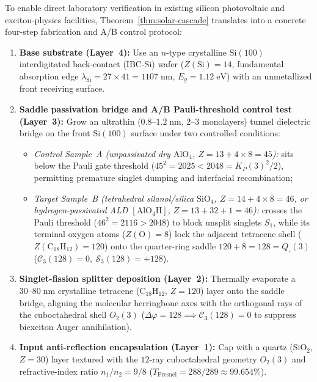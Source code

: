 \documentclass[11pt,a4paper]{article}
\theoremstyle{plain}
\theoremstyle{definition}
\begin{document}
To enable direct laboratory verification in existing silicon photovoltaic and exciton-physics facilities, Theorem~\ref{thm:solar-cascade} translates into a concrete four-step fabrication and A/B control protocol:
\begin{enumerate}[label=\textbf{Step~\arabic*.},leftmargin=*]
\item \textbf{Base substrate (Layer~4):}
  Use an $n$-type crystalline $\mathrm{Si}(100)$ interdigitated back-contact (IBC-$\mathrm{Si}$) wafer ($Z(\mathrm{Si})=14$, fundamental absorption edge $\lambda_{\mathrm{Si}} = 27\times 41 = 1107\;\text{nm}$, $E_g = 1.12\;\text{eV}$) with an unmetallized front receiving surface.
\item \textbf{Saddle passivation bridge and A/B Pauli-threshold control test (Layer~3):}
  Grow an ultrathin ($0.8\text{--}1.2\;\text{nm}$, $2\text{--}3$ monolayers) tunnel dielectric bridge on the front $\mathrm{Si}(100)$ surface under two controlled conditions:
  \begin{itemize}[noitemsep]
  \item \emph{Control Sample~A (unpassivated dry $\mathrm{AlO_4}$, $Z = 13 + 4\times 8 = 45$):} sits below the Pauli gate threshold ($45^2 = 2025 < 2048 = K_P(3)^2/2$), permitting premature singlet dumping and interfacial recombination;
  \item \emph{Target Sample~B (tetrahedral silanol/silica $\mathrm{SiO_4}$, $Z = 14 + 4\times 8 = 46$, or hydrogen-passivated ALD $[\mathrm{AlO_4H}]$, $Z = 13 + 32 + 1 = 46$):} crosses the Pauli threshold ($46^2 = 2116 > 2048$) to block unsplit singlets $S_1$, while its terminal oxygen atoms ($Z(\mathrm{O}) = 8$) lock the adjacent tetracene shell ($Z(\mathrm{C_{18}H_{12}}) = 120$) onto the quarter-ring saddle $120 + 8 = 128 = Q_\square(3)$ ($\mathcal{C}_3(128) = 0,\ \mathcal{S}_3(128) = +128$).
  \end{itemize}
\item \textbf{Singlet-fission splitter deposition (Layer~2):}
  Thermally evaporate a $30\text{--}80\;\text{nm}$ crystalline tetracene ($\mathrm{C_{18}H_{12}}$, $Z = 120$) layer onto the saddle bridge, aligning the molecular herringbone axes with the orthogonal rays of the cuboctahedral shell $O_2(3)$ ($\Delta\varphi = 128 \implies \mathcal{C}_3(128) = 0$ to suppress biexciton Auger annihilation).
\item \textbf{Input anti-reflection encapsulation (Layer~1):}
  Cap with a quartz ($\mathrm{SiO_2}$, $Z = 30$) layer textured with the $12$-ray cuboctahedral geometry $O_2(3)$ and refractive-index ratio $n_1/n_2 = 9/8$ ($T_{\mathrm{Fresnel}} = 288/289 \approx 99.654\%$).
\end{enumerate}
\end{document}
